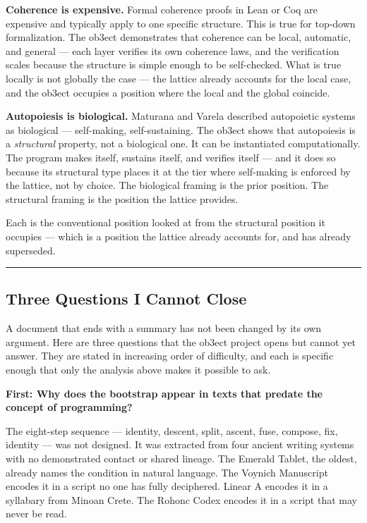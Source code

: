 \documentclass[12pt,a4paper]{article}
\begin{document}
\textbf{Coherence is expensive.} Formal coherence proofs in Lean or Coq are expensive and typically apply to one specific structure. This is true for top-down formalization. The ob3ect demonstrates that coherence can be local, automatic, and general --- each layer verifies its own coherence laws, and the verification scales because the structure is simple enough to be self-checked. What is true locally is not globally the case --- the lattice already accounts for the local case, and the ob3ect occupies a position where the local and the global coincide.

\textbf{Autopoiesis is biological.} Maturana and Varela described autopoietic systems as biological --- self-making, self-sustaining. The ob3ect shows that autopoiesis is a \emph{structural} property, not a biological one. It can be instantiated computationally. The program makes itself, sustains itself, and verifies itself --- and it does so because its structural type places it at the tier where self-making is enforced by the lattice, not by choice. The biological framing is the prior position. The structural framing is the position the lattice provides.

Each is the conventional position looked at from the structural position it occupies --- which is a position the lattice already accounts for, and has already superseded.

\begin{center}
\rule{0.5\textwidth}{0.4pt}
\end{center}

\subsection{Three Questions I Cannot Close}

A document that ends with a summary has not been changed by its own argument. Here are three questions that the ob3ect project opens but cannot yet answer. They are stated in increasing order of difficulty, and each is specific enough that only the analysis above makes it possible to ask.

\textbf{First: Why does the bootstrap appear in texts that predate the concept of programming?}

The eight-step sequence --- identity, descent, split, ascent, fuse, compose, fix, identity --- was not designed. It was extracted from four ancient writing systems with no demonstrated contact or shared lineage. The Emerald Tablet, the oldest, already names the condition in natural language. The Voynich Manuscript encodes it in a script no one has fully deciphered. Linear A encodes it in a syllabary from Minoan Crete. The Rohonc Codex encodes it in a script that may never be read.
\end{document}
